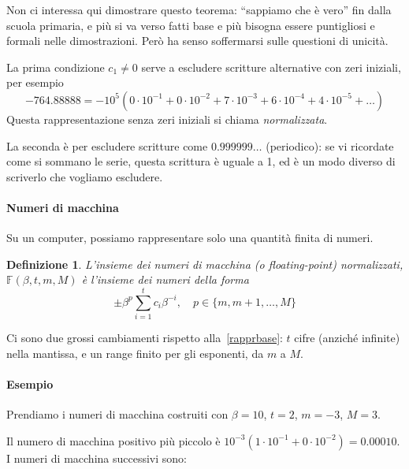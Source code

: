 \documentclass[a4paper]{report}
\theoremstyle{definiton}
\newtheorem{definition}[theorem]{Definizione}
\theoremstyle{remark}
\begin{document}
Non ci interessa qui dimostrare questo teorema: ``sappiamo che è vero'' fin dalla scuola primaria, e più si va verso fatti base e più bisogna essere puntigliosi e formali nelle dimostrazioni. Però ha senso soffermarsi sulle questioni di unicità.

La prima condizione $c_1 \neq 0$ serve a escludere scritture alternative con zeri iniziali, per esempio
\[
-764.88888 = - 10^5 (0 \cdot 10^{-1} + 0 \cdot 10^{-2} + 7\cdot 10^{-3} + 6\cdot 10^{-4} + 4\cdot 10^{-5} + \dots)
\]
Questa rappresentazione senza zeri iniziali si chiama \emph{normalizzata}.

La seconda è per escludere scritture come $0.999999\dots$ (periodico): se vi ricordate come si sommano le serie, questa scrittura è uguale a 1, ed è un modo diverso di scriverlo che vogliamo escludere.

\paragraph{Numeri di macchina}
Su un computer, possiamo rappresentare solo una quantità finita di numeri.
\begin{definition}
    L'insieme dei \emph{numeri di macchina (o floating-point) normalizzati}, $\mathbb{F}(\beta, t, m, M)$ è l'insieme dei numeri della forma
    \[
        \pm \beta^p \sum_{i=1}^t c_i \beta^{-i}, \quad p \in \{m, m+1, \dots, M\}  
    \]
\end{definition}
Ci sono due grossi cambiamenti rispetto alla~\eqref{rapprbase}: $t$ cifre (anziché infinite) nella mantissa, e un range finito per gli esponenti, da $m$ a $M$.

\paragraph{Esempio} Prendiamo i numeri di macchina costruiti con $\beta=10$, $t=2$, $m=-3$, $M=3$.

Il numero di macchina positivo più piccolo è $10^{-3}(1 \cdot 10^{-1} + 0 \cdot 10^{-2}) = 0.00010$. I numeri di macchina successivi sono:
\end{document}
